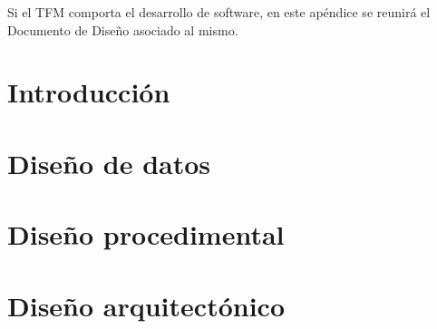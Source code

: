 
Si el TFM comporta el desarrollo de software, en este apéndice se reunirá el Documento de Diseño asociado al mismo.

\section{Introducción}

\section{Diseño de datos}

\section{Diseño procedimental}

\section{Diseño arquitectónico}


